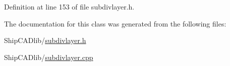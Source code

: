 Definition at line 153 of file subdivlayer.\-h.



The documentation for this class was generated from the following files\-:\begin{DoxyCompactItemize}
\item 
Ship\-C\-A\-Dlib/\hyperlink{subdivlayer_8h}{subdivlayer.\-h}\item 
Ship\-C\-A\-Dlib/\hyperlink{subdivlayer_8cpp}{subdivlayer.\-cpp}\end{DoxyCompactItemize}
